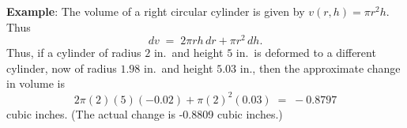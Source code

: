 \documentclass[12pt,fleqn]{article}
\def\eg#1{{\bf Example}: #1}
\begin{document}
\vspace{0.2in}
\ni
\eg{}The volume of a right circular cylinder is given by
$v(r,h) = \pi r^2 h$.  Thus
$$ dv \;=\; 2\pi rh\, dr + \pi r^2\, dh. $$
Thus, if a cylinder of radius $2$ in.~and height $5$ in.~is
deformed to a different cylinder, now of radius $1.98$
in.~and height $5.03$ in., then the approximate change in
volume is
$$ 2\pi (2)(5)(-0.02) + \pi(2)^2(0.03) \;=\; -0.8797 $$
cubic inches.  (The actual change is -0.8809 cubic inches.)
\end{document}
